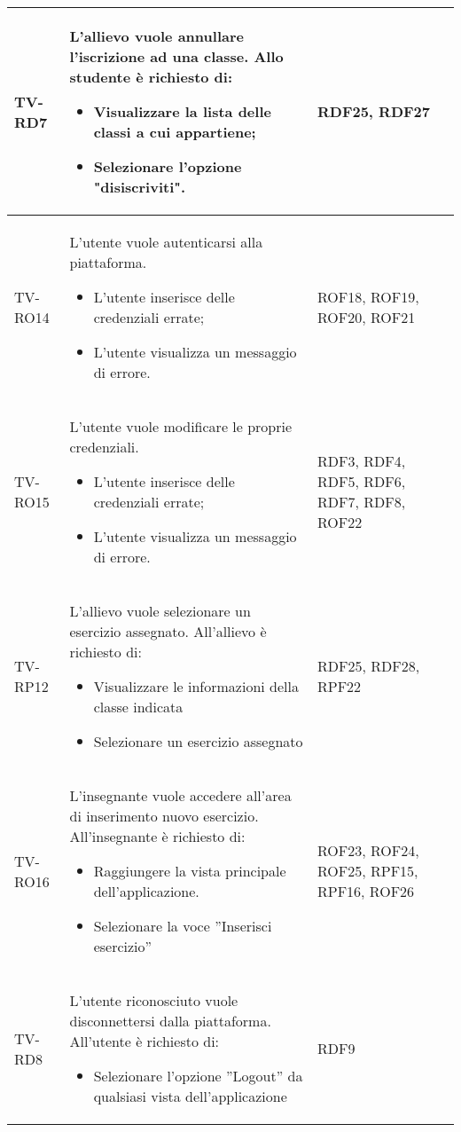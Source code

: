 \begin{longtable}{|>{\centering\arraybackslash}m{1.6cm}|>{\centering\arraybackslash}m{6.41cm}|>{\centering\arraybackslash}m{3.1cm} | >{\centering\arraybackslash}m{2.6cm}|}
		TV-RD7 & L'allievo vuole annullare l'iscrizione ad una classe. Allo studente è richiesto di:
		\begin{itemize}
			\item Visualizzare la lista delle classi a cui appartiene;
			\item Selezionare l'opzione "disiscriviti".		
		\end{itemize}  & RDF25, RDF27 \\ \hline
		
		  \rowcolor{LightGray}
		TV-RO14 & L'utente vuole autenticarsi alla piattaforma. 
		\begin{itemize}
			\item L'utente inserisce delle credenziali errate;
			\item L'utente visualizza un messaggio di errore.
		\end{itemize}  & ROF18, ROF19, ROF20, ROF21 \\ \hline
		
		TV-RO15 & L'utente vuole modificare le proprie credenziali. 
		\begin{itemize}
			\item L'utente inserisce delle credenziali errate;
			\item L'utente visualizza un messaggio di errore.
		\end{itemize}  & RDF3, RDF4, RDF5, RDF6, RDF7, RDF8, ROF22 \\ \hline
		
		  \rowcolor{LightGray}
  TV-RP12 & L’allievo vuole selezionare un esercizio assegnato. All'allievo è richiesto di:
  \begin{itemize}
   \item Visualizzare le informazioni della classe indicata
   \item Selezionare un esercizio assegnato
  \end{itemize}  & RDF25, RDF28, RPF22 \\ \hline

 TV-RO16 & L’insegnante vuole accedere all’area di inserimento nuovo esercizio. All'insegnante è richiesto di:
 \begin{itemize}
  \item Raggiungere la vista principale dell’applicazione.
  \item Selezionare la voce ”Inserisci esercizio”
 \end{itemize}  & ROF23, ROF24, ROF25, RPF15, RPF16, ROF26 \\ \hline
  \rowcolor{LightGray}
  TV-RD8 & L’utente riconosciuto vuole disconnettersi dalla piattaforma. All'utente è richiesto di:
  \begin{itemize}
   \item Selezionare l’opzione ”Logout” da qualsiasi vista dell'applicazione
  \end{itemize}  & RDF9 \\ \hline
 

\end{longtable}

